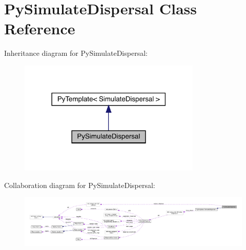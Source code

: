 \hypertarget{class_py_simulate_dispersal}{}\section{Py\+Simulate\+Dispersal Class Reference}
\label{class_py_simulate_dispersal}


Inheritance diagram for Py\+Simulate\+Dispersal\+:
\nopagebreak
\begin{figure}[H]
\begin{center}
\leavevmode
\includegraphics[width=246pt]{class_py_simulate_dispersal__inherit__graph}
\end{center}
\end{figure}


Collaboration diagram for Py\+Simulate\+Dispersal\+:
\nopagebreak
\begin{figure}[H]
\begin{center}
\leavevmode
\includegraphics[width=350pt]{class_py_simulate_dispersal__coll__graph}
\end{center}
\end{figure}
